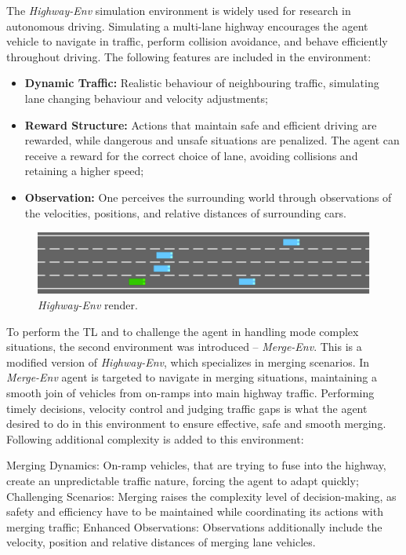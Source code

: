 The \emph{Highway-Env} simulation environment is widely used for research in autonomous driving. Simulating a multi-lane highway encourages the agent vehicle to navigate in traffic, perform collision avoidance, and behave efficiently throughout driving. The following features are included in the environment:

\begin{itemize}
    \item \textbf{Dynamic Traffic:} Realistic behaviour of neighbouring traffic, simulating lane changing behaviour and velocity adjustments;

    \item \textbf{Reward Structure:} Actions that maintain safe and efficient driving are rewarded, while dangerous and unsafe situations are penalized. The agent can receive a reward for the correct choice of lane, avoiding collisions and retaining a higher speed;

    \item \textbf{Observation:} One perceives the surrounding world through observations of the velocities, positions, and relative distances of surrounding cars.
\end{itemize}

\begin{figure}[H]
    \centering
    \includegraphics[width=\textwidth]{images/Highway.png}
    \caption{\emph{Highway-Env} render.}
    \label{fig:iterations_plot}
\end{figure}

To perform the TL and to challenge the agent in handling mode complex situations, the second environment was introduced -- \emph{Merge-Env}. This is a modified version of \emph{Highway-Env}, which specializes in merging scenarios. In \emph{Merge-Env} agent is targeted to navigate in merging situations, maintaining a smooth join of vehicles from on-ramps into main highway traffic. Performing timely decisions, velocity control and judging traffic gaps is what the agent desired to do in this environment to ensure effective, safe and smooth merging. Following additional complexity is added to this environment:

Merging Dynamics: On-ramp vehicles, that are trying to fuse into the highway, create an unpredictable traffic nature, forcing the agent to adapt quickly;
Challenging Scenarios: Merging raises the complexity level of decision-making, as safety and efficiency have to be maintained while coordinating its actions with merging traffic;
Enhanced Observations: Observations additionally include the velocity, position and relative distances of merging lane vehicles.

